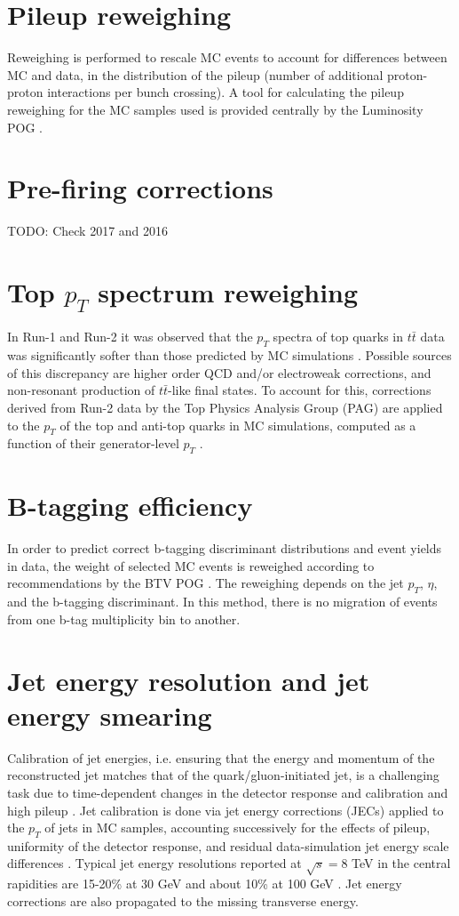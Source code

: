 \section{Pileup reweighing}
Reweighing is performed to rescale MC events to account for differences between MC and data, in the distribution of the pileup (number of additional proton-proton interactions per bunch crossing). A tool for calculating the pileup reweighing for the MC samples used is provided centrally by the Luminosity POG \cite{twiki_LUMI_POG_recommendation}.

\section{Pre-firing corrections}
TODO: Check 2017 and 2016

\section{Top $p_{T}$ spectrum reweighing}
In Run-1 and Run-2 it was observed that the $p_{T}$ spectra of top quarks in $t\bar{t}$ data was significantly softer than those predicted by MC simulations \cite{twiki_Top_pt_reweighing}. Possible sources of this discrepancy are higher order QCD and/or electroweak corrections, and non-resonant production of $t\bar{t}$-like final states. To account for this, corrections derived from Run-2 data by the Top Physics Analysis Group (PAG) are applied to the $p_{T}$ of the top and anti-top quarks in MC simulations, computed as a function of their generator-level $p_{T}$ \cite{twiki_Top_pt_reweighing}.

\section{B-tagging efficiency}
In order to predict correct b-tagging discriminant distributions and event yields in data, the weight of selected MC events is reweighed according to recommendations by the BTV POG \cite{twiki_btag_SF_methods}. The reweighing depends on the jet $p_{T}$, $\eta$, and the b-tagging discriminant. In this method, there is no migration of events from one b-tag multiplicity bin to another.

\section{Jet energy resolution and jet energy smearing}
Calibration of jet energies, i.e. ensuring that the energy and momentum of the reconstructed jet matches that of the quark/gluon-initiated jet, is a challenging task due to time-dependent changes in the detector response and calibration and high pileup \cite{CMS-JME-13-004} \cite{proceedings-Agarwal:2022txa}. Jet calibration is done via jet energy corrections (JECs) applied to the $p_{T}$ of jets in MC samples, accounting successively for the effects of pileup, uniformity of the detector response, and residual data-simulation jet energy scale differences \cite{twiki_JetResolution_JEC}. Typical jet energy resolutions reported at $\sqrt{s} = 8$ TeV in the central rapidities are 15-20\% at 30 GeV and about 10\% at 100 GeV \cite{CMS-JME-13-004}. Jet energy corrections are also propagated to the missing transverse energy.


